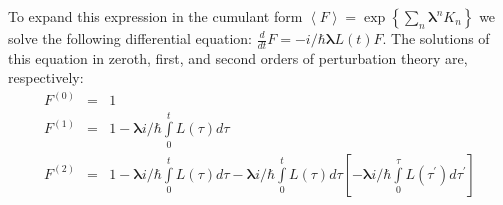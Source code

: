 \documentclass[12pt,twoside,a4paper]{report}
\begin{document}
To expand this expression in the  cumulant form 
$\left\langle
     F
 \right\rangle
                    =
 \exp 
                              \left\{ 
                                    \sum\limits_n 
                                         \mathbf{\lambda }^n
                                         K_n
                              \right\}  
$
we solve the following differential equation:
$%
\frac 
d{dt}
F        
      =
         -  i/\hbar 
            \mathbf{\lambda }
            L\left( t\right) F   
$. %
The solutions of 
this equation
in zeroth, first, and second orders 
of perturbation theory are, respectively: 
\begin{eqnarray} 
F
^{\left( 
       0
  \right) }
            &=&
                   1  \nonumber \\ 
F
^{\left( 
       1
  \right) }  
            &=&
                   1
                -  \mathbf{\lambda }
                   i/\hbar 
                   \int\limits_0^t 
                       L\left( \tau \right) 
                   d\tau  \nonumber \\ 
F
^{\left( 
       2
  \right) } 
            &=&   
                  1
               -  \mathbf{\lambda }
                  i/\hbar 
                  \int\limits_0^t
                       L\left( \tau \right) 
                  d\tau 
               -  \mathbf{\lambda }
                  i/\hbar  
                  \int\limits_0^t
                      L\left( \tau \right) 
                  d\tau 
                  \left[ 
                      -  \mathbf{\lambda }
                         i/\hbar 
                         \int\limits_0^\tau 
                             L\left( \tau ^{\prime }\right) 
                         d\tau ^{\prime }
                  \right] 
\end{eqnarray}  
\end{document}
